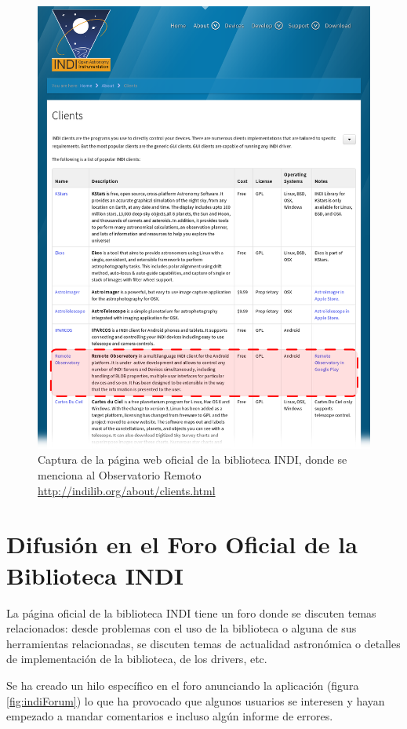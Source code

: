 \begin{figure}
 \centering
 \includegraphics[width=12cm]{../images/indilibWeb3.png}
 \caption{Captura de la página web oficial de la biblioteca INDI, donde se menciona al Observatorio Remoto \protect\href{http://indilib.org/about/clients.html}{http://indilib.org/about/clients.html}}
 \label{fig:indiLibWeb}
\end{figure}



\section{Difusión en el Foro Oficial de la Biblioteca INDI}

La página oficial de la biblioteca INDI tiene un foro donde se discuten temas relacionados: desde problemas con el uso de la biblioteca o alguna de sus herramientas relacionadas, se discuten temas de actualidad astronómica o detalles de implementación de la biblioteca, de los drivers, etc.

Se ha creado un hilo específico en el foro anunciando la aplicación (figura \ref{fig:indiForum}) lo que ha provocado que algunos usuarios se interesen y hayan empezado a mandar comentarios e incluso algún informe de errores.


